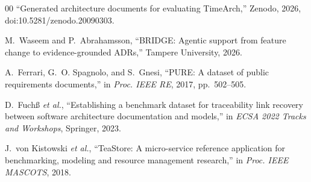 \documentclass[conference]{IEEEtran}
\begin{document}
\begin{thebibliography}{00}
``Generated architecture documents for evaluating TimeArch,'' Zenodo, 2026, doi:10.5281/zenodo.20090303.

M.~Waseem and P.~Abrahamsson, ``BRIDGE: Agentic support from feature change to evidence-grounded ADRs,'' Tampere University, 2026.

A.~Ferrari, G.~O. Spagnolo, and S.~Gnesi, ``PURE: A dataset of public requirements documents,'' in \textit{Proc. IEEE RE}, 2017, pp.~502--505.

D.~Fuch{\ss} \textit{et al.}, ``Establishing a benchmark dataset for traceability link recovery between software architecture documentation and models,'' in \textit{ECSA 2022 Tracks and Workshops}, Springer, 2023.

J.~von Kistowski \textit{et al.}, ``TeaStore: A micro-service reference application for benchmarking, modeling and resource management research,'' in \textit{Proc. IEEE MASCOTS}, 2018.

\end{thebibliography}
\end{document}
